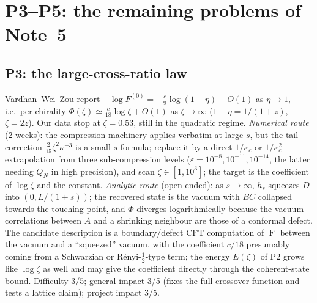 \documentclass[11pt]{article}
\theoremstyle{accent}
\theoremstyle{definition}
\newcommand{\eps}{\varepsilon}
\newcommand{\Fid}{\operatorname{F}}
\begin{document}
\section{P3--P5: the remaining problems of Note~5}\label{sec:P345}

\subsection{P3: the large-cross-ratio law}
Vardhan--Wei--Zou report \(-\log F^{(0)}=-\frac c9\log(1-\eta)+O(1)\) as \(\eta\to1\), i.e.\ per chirality \(\Phi(\zeta)\simeq\frac{c}{18}\log\zeta+O(1)\) as \(\zeta\to\infty\) (\(1-\eta=1/(1+z)\), \(\zeta=2z\)).  Our data stop at \(\zeta=0.53\), still in the quadratic regime.
\emph{Numerical route} (2 weeks): the compression machinery applies verbatim at large \(s\), but the tail correction \(\frac2{15}\zeta^2\kappa^{-3}\) is a small-\(s\) formula; replace it by a direct \(1/\kappa_c\) or \(1/\kappa_c^2\) extrapolation from three sub-compression levels (\(\eps=10^{-8},10^{-11},10^{-14}\), the latter needing \(Q_N\) in high precision), and scan \(\zeta\in[1,10^3]\); the target is the coefficient of \(\log\zeta\) and the constant.
\emph{Analytic route} (open-ended): as \(s\to\infty\), \(h_s\) squeezes \(D\) into \((0,L/(1+s))\); the recovered state is the vacuum with \(BC\) collapsed towards the touching point, and \(\Phi\) diverges logarithmically because the vacuum correlations between \(A\) and a shrinking neighbour are those of a conformal defect.  The candidate description is a boundary/defect CFT computation of \(\Fid\) between the vacuum and a ``squeezed'' vacuum, with the coefficient \(c/18\) presumably coming from a Schwarzian or R\'enyi-\(\frac12\)-type term; the energy \(E(\zeta)\) of P2 grows like \(\log\zeta\) as well and may give the coefficient directly through the coherent-state bound.
Difficulty 3/5; general impact 3/5 (fixes the full crossover function and tests a lattice claim); project impact 3/5.
\end{document}
